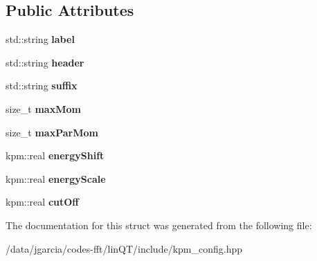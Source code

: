 \subsection*{Public Attributes}
\begin{DoxyCompactItemize}
\item 
std\+::string {\bfseries label}\hypertarget{structkpm_1_1config_a33f7800484133db82f6b8674858a565b}{}\label{structkpm_1_1config_a33f7800484133db82f6b8674858a565b}

\item 
std\+::string {\bfseries header}\hypertarget{structkpm_1_1config_a8dab325f53f9f069f7c2d9dbb241a456}{}\label{structkpm_1_1config_a8dab325f53f9f069f7c2d9dbb241a456}

\item 
std\+::string {\bfseries suffix}\hypertarget{structkpm_1_1config_af03dada9eec3aaf1fb56185e236c9e99}{}\label{structkpm_1_1config_af03dada9eec3aaf1fb56185e236c9e99}

\item 
size\+\_\+t {\bfseries max\+Mom}\hypertarget{structkpm_1_1config_a32f2207de5971c188d3f3bc1398b3c06}{}\label{structkpm_1_1config_a32f2207de5971c188d3f3bc1398b3c06}

\item 
size\+\_\+t {\bfseries max\+Par\+Mom}\hypertarget{structkpm_1_1config_a4104ada186c1eeb89f91f5f27cd299f0}{}\label{structkpm_1_1config_a4104ada186c1eeb89f91f5f27cd299f0}

\item 
kpm\+::real {\bfseries energy\+Shift}\hypertarget{structkpm_1_1config_aea548dcd47fcef90452a7fd0c0d20a49}{}\label{structkpm_1_1config_aea548dcd47fcef90452a7fd0c0d20a49}

\item 
kpm\+::real {\bfseries energy\+Scale}\hypertarget{structkpm_1_1config_af5b8cd979bc22aaa4638eed8100f8505}{}\label{structkpm_1_1config_af5b8cd979bc22aaa4638eed8100f8505}

\item 
kpm\+::real {\bfseries cut\+Off}\hypertarget{structkpm_1_1config_abc74a6c2544142735356881eec4db660}{}\label{structkpm_1_1config_abc74a6c2544142735356881eec4db660}

\end{DoxyCompactItemize}


The documentation for this struct was generated from the following file\+:\begin{DoxyCompactItemize}
\item 
/data/jgarcia/codes-\/fft/lin\+Q\+T/include/kpm\+\_\+config.\+hpp\end{DoxyCompactItemize}
